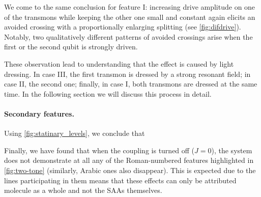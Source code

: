 \documentclass[%
 aip,
 amsmath,amssymb,
 reprint,%
]{revtex4-1}
\begin{document}
We come to the same conclusion for feature I: increasing drive amplitude on one of the transmons while keeping the other one small and constant again elicits an avoided crossing with a proportionally enlarging splitting (see \autoref{fig:difdrive}). Notably, two qualitatively different patterns of avoided crossings arise when the first or the second qubit is strongly driven.


These observation lead to understanding that the effect is caused by light dressing. In case III, the first transmon is dressed by a strong resonant field; in case II, the second one; finally, in case I, both transmons are dressed at the same time. In the following section we will discuss this process in detail.


\paragraph{Secondary features.} Using \autoref{fig:statinary_levels}, we conclude that 

Finally, we have found that when the coupling is turned off ($J=0$), the system does not demonstrate at all any of the Roman-numbered features highlighted in \autoref{fig:two-tone} (similarly, Arabic ones also disappear). This is expected due to the lines participating in them  means that these effects can only be attributed molecule as a whole and not the SAAs themselves. 
\end{document}
